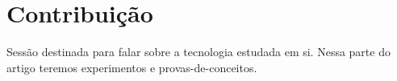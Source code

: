 \section{Contribuição}\label{sec:cont}
Sessão destinada para falar sobre a tecnologia estudada em si. Nessa parte do artigo teremos experimentos e provas-de-conceitos.